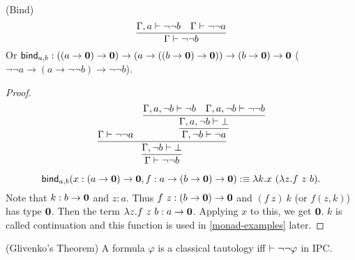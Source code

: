 \newcommand{\bind}{\name{bind}}
\begin{lemma}
    \label{bind-ipc}
    (Bind)
    $$
        \infer{\Gamma\proves\neg\neg b}{
            \Gamma,a\proves\neg\neg b
             & \Gamma\proves\neg\neg a
        }
    $$
    Or $\bind_{a,b}:((a\to \zero)\to\zero)\to(a\to((b\to \zero)\to \zero))\to (b\to \zero)\to \zero$
    ($\neg\neg a\to (a\to \neg\neg b)\to \neg\neg b$).
\end{lemma}
\begin{proof}
    $$
    \infer{\Gamma\proves\neg\neg b}{\infer{\Gamma,\neg b\proves\bot}{
        \Gamma\proves\neg\neg a &
        \infer{\Gamma,\neg b\proves\neg a}{
            \infer{\Gamma,a,\neg b\proves\bot}{
                \Gamma,a,\neg b\proves\neg b
                &
                \Gamma,a,\neg b\proves\neg\neg b
            }
        }
    }}
    $$

    $$
    \bind_{a,b}(x:(a\to\zero)\to \zero, f: a\to(b\to \zero)\to\zero)
    \defn \lambda k. x\ (\lambda z. f\ z\ b).
    $$
    Note that $k: b\to \mathbf{0}$ and $z: a$. Thus $f\ z:(b\to\mathbf{0})\to\mathbf{0}$
    and $(f\ z)\ k$ (or $f(z,k)$) has type $\mathbf{0}$. Then the term
    $\lambda z.f\ z\ b: a\to\mathbf{0}$. Applying $x$ to this, we get $\mathbf{0}$.
    $k$ is called continuation and this function is used in 
    \autoref{monad-examples} later.
\end{proof}
\begin{theorem}
    \label{glivenko-theorem}
    (Glivenko's Theorem) A formula $\varphi$ is a classical tautology
    iff $\vdash\neg\neg\varphi$ in IPC. 
\end{theorem}
